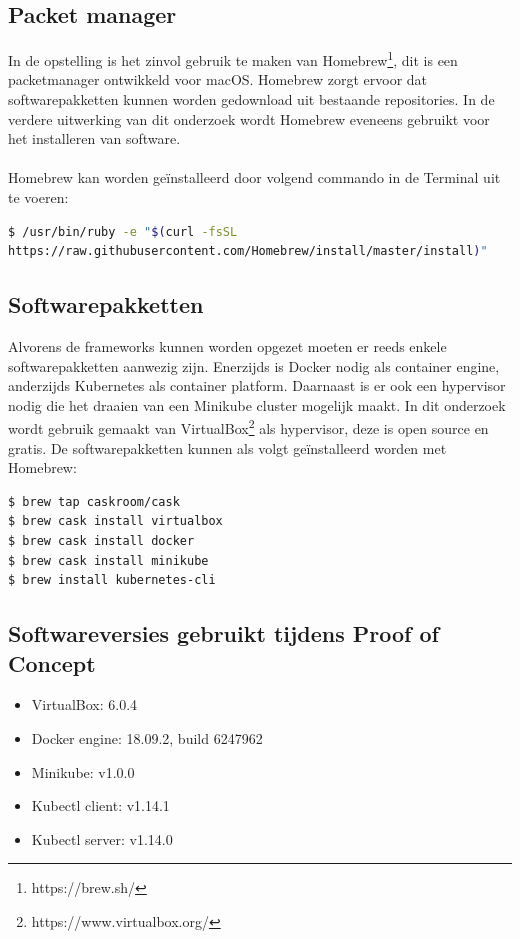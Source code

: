\subsection{Packet manager}
In de opstelling is het zinvol gebruik te maken van Homebrew\footnote{https://brew.sh/}, dit is een packetmanager ontwikkeld voor macOS. Homebrew zorgt ervoor dat softwarepakketten kunnen worden gedownload uit bestaande repositories. In de verdere uitwerking van dit onderzoek wordt Homebrew eveneens gebruikt voor het installeren van software.\\\\
Homebrew kan worden geïnstalleerd door volgend commando in de Terminal uit te voeren: 
\begin{lstlisting}[language=bash]
$ /usr/bin/ruby -e "$(curl -fsSL 
https://raw.githubusercontent.com/Homebrew/install/master/install)"
\end{lstlisting}

\subsection{Softwarepakketten}
\label{sec:software}
Alvorens de frameworks kunnen worden opgezet moeten er reeds enkele softwarepakketten aanwezig zijn. Enerzijds is Docker nodig als container engine, anderzijds Kubernetes als container platform. Daarnaast is er ook een hypervisor nodig die het draaien van een Minikube cluster mogelijk maakt. In dit onderzoek wordt gebruik gemaakt van VirtualBox\footnote{https://www.virtualbox.org/} als hypervisor, deze is open source en gratis. De softwarepakketten kunnen als volgt geïnstalleerd worden met Homebrew:        
\begin{lstlisting}[language=bash]
$ brew tap caskroom/cask
$ brew cask install virtualbox
$ brew cask install docker
$ brew cask install minikube
$ brew install kubernetes-cli
\end{lstlisting}

\subsection{Softwareversies gebruikt tijdens Proof of Concept}
\begin{itemize}
    \item VirtualBox: 6.0.4 
    \item Docker engine: 18.09.2, build 6247962
    \item Minikube: v1.0.0
    \item Kubectl client: v1.14.1
    \item Kubectl server: v1.14.0
\end{itemize}

